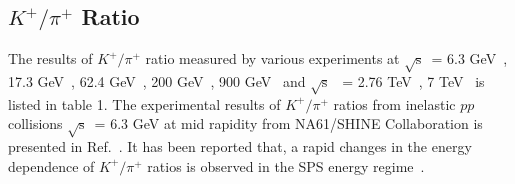\documentclass{article}
\newcommand{\sqrts}{\mbox{$\sqrt{\mathrm{s}}$}}
\begin{document}
\subsection{$K^+/\pi^+$ Ratio}

The results of $K^+/\pi^+$ ratio measured by various experiments at \sqrts~= 6.3 GeV~\cite{Pulawski:2015tka}, 17.3 GeV~\cite{NA49:2009brx}, 62.4 GeV~\cite{PHENIX:2011rvu}, 200 GeV~\cite{STAR:2008med}, 900 GeV~\cite{ALICE:2011gmo} and \sqrts~ = 2.76 TeV~\cite{ALICE:2015ial}, 7 TeV~\cite{ALICE:2015ial} is listed in table 1. The experimental results of $K^+/\pi^+$ ratios from inelastic $pp$ collisions \sqrts~= 6.3 GeV at mid rapidity from NA61/SHINE Collaboration is presented in Ref.~\cite{Pulawski:2015tka}. It has been reported that, a rapid changes in the energy dependence of $K^+/\pi^+$ ratios is observed in the SPS energy regime~\cite{Pulawski:2015tka}. %
\end{document}
